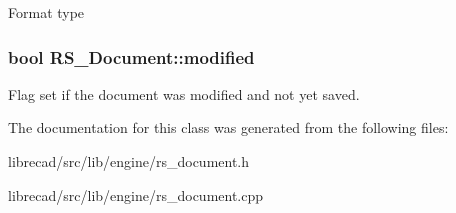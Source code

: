 Format type \hypertarget{classRS__Document_a33c3706d1fa8ae816192c085b72290f0}{
\subsubsection[{modified}]{\setlength{\rightskip}{0pt plus 5cm}bool R\-S\-\_\-\-Document\-::modified\hspace{0.3cm}{\ttfamily [protected]}}}\label{classRS__Document_a33c3706d1fa8ae816192c085b72290f0}
Flag set if the document was modified and not yet saved. 

The documentation for this class was generated from the following files\-:\begin{DoxyCompactItemize}
\item 
librecad/src/lib/engine/rs\-\_\-document.\-h\item 
librecad/src/lib/engine/rs\-\_\-document.\-cpp\end{DoxyCompactItemize}
